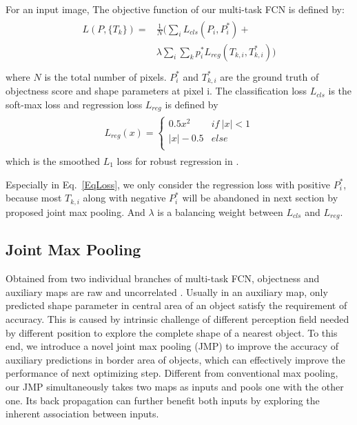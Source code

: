 For an input image, The objective function of our multi-task FCN is defined by:
\begin{eqnarray}\label{EqLoss}
\begin{aligned}
L(P,\{T_k\}) =& \frac{1}{N}(\sum_{i}L_{cls}(P_i,P^*_{i})+\\
&\lambda\sum_{i}\sum_{k}p^*_{i}L_{reg}(T_{k,i},T^*_{k,i}))\\
\end{aligned}
\end{eqnarray}
where $N$ is the total number of pixels.
$P^*_i$ and $T^*_{k,i}$ are the ground truth of objectness score and shape parameters at pixel i.
The classification loss $L_{cls}$ is the soft-max loss and regression loss $L_{reg}$ is defined by
\begin{eqnarray}
\label{EqSmoothL1}
\begin{aligned}
L_{reg}(x) =\left\{\begin{array}{cc}
0.5x^2&if~|x|<1\\
|x|-0.5&else\\
\end{array}\right.
\end{aligned}
\end{eqnarray}
which is the smoothed $L_1$ loss for robust regression in \cite{Ren2015}.

Especially in Eq.~\ref{EqLoss}, we only consider the regression loss with positive $P^*_i$, because most $T_{k,i}$ along with negative $P^*_i$ will be abandoned in next section by proposed joint max pooling.
And $\lambda$ is a balancing weight between $L_{cls}$ and $L_{reg}$.

\subsection{Joint Max Pooling}
\label{sec:joint-max-pooling}

Obtained from two individual branches of multi-task FCN, objectness and auxiliary maps are raw and uncorrelated .
Usually in an auxiliary map, only predicted shape parameter in central area of an object satisfy the requirement of accuracy.
This is caused by intrinsic challenge of different perception field needed by different position to explore the complete shape of a nearest object.
To this end, we introduce a novel joint max pooling (JMP) to improve the accuracy of auxiliary predictions in border area of objects, which can effectively improve the performance of next optimizing step.
Different from conventional max pooling, our JMP simultaneously takes two maps as inputs and pools one with the other one.
Its back propagation can further benefit both inputs by exploring the inherent association between inputs.

